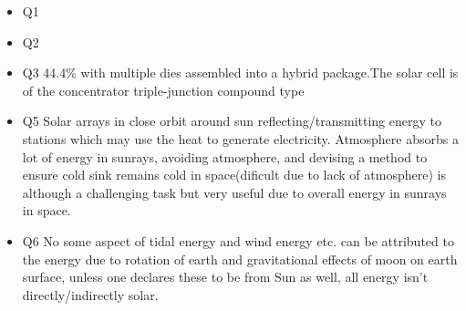 \documentclass{article}
\begin{document}
\begin{itemize}
    \item Q1
    \item Q2
    \item Q3
    44.4\% with multiple dies assembled into a hybrid package.The solar cell is of the concentrator triple-junction compound type
    \item Q5
    Solar arrays in close orbit around sun reflecting/transmitting energy to stations which may use the heat to generate electricity. Atmosphere absorbs a lot of energy in sunrays, avoiding atmosphere, and devising a method to ensure cold sink remains cold in space(dificult due to lack of atmosphere) is although a challenging task but very useful due to overall energy in sunrays in space.
    \item Q6
    No some aspect of tidal energy and wind energy etc. can be attributed to the energy due to rotation of earth and gravitational effects of moon on earth surface, unless one declares these to be from Sun as well, all energy isn't directly/indirectly solar.
\end{itemize}
\end{document}
